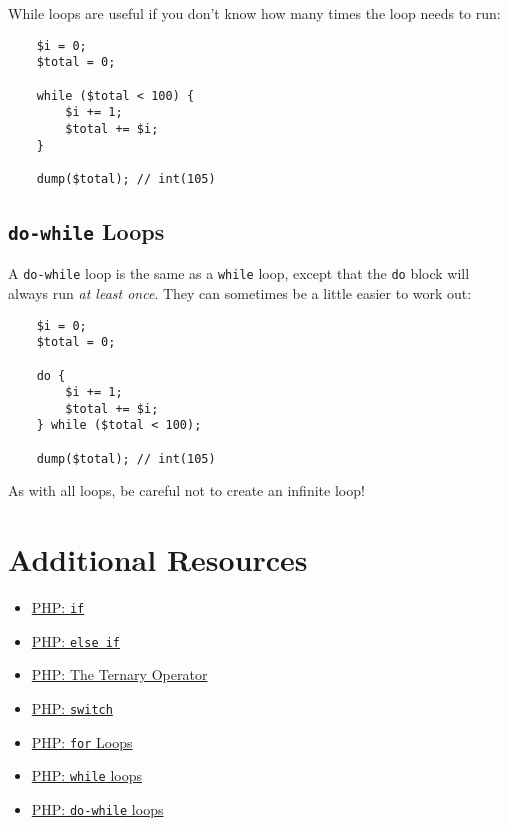 While loops are useful if you don't know how many times the loop needs to run:

\begin{verbatim}
    $i = 0;
    $total = 0;

    while ($total < 100) {
        $i += 1;
        $total += $i;
    }

    dump($total); // int(105)
\end{verbatim}

\subsection{\texttt{do-while} Loops}

A \texttt{do-while} loop is the same as a \texttt{while} loop, except that the \texttt{do} block will always run \textit{at least once}. They can sometimes be a little easier to work out:

\begin{verbatim}
    $i = 0;
    $total = 0;

    do {
        $i += 1;
        $total += $i;
    } while ($total < 100);

    dump($total); // int(105)
\end{verbatim}

\hr

As with all loops, be careful not to create an infinite loop!


\section{Additional Resources}

\begin{itemize}[leftmargin=*]
    \item \href{http://www.php.net/manual/en/control-structures.if.php}{PHP: \texttt{if}}
    \item \href{http://www.php.net/manual/en/control-structures.elseif.php}{PHP: \texttt{else if}}
    \item \href{https://www.php.net/manual/en/language.operators.comparison.php#language.operators.comparison.ternary}{PHP: The Ternary Operator}
    \item \href{http://www.php.net/manual/en/control-structures.switch.php}{PHP: \texttt{switch}}
    \item \href{http://www.php.net/manual/en/control-structures.for.php}{PHP: \texttt{for} Loops}
    \item \href{http://www.php.net/manual/en/control-structures.while.php}{PHP: \texttt{while} loops}
    \item \href{http://www.php.net/manual/en/control-structures.do.while.php}{PHP: \texttt{do-while} loops}
\end{itemize}
